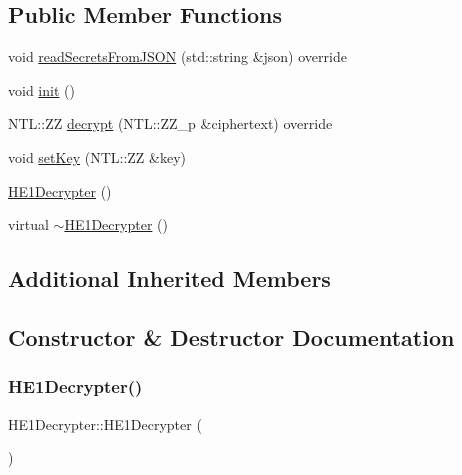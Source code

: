 \subsection*{Public Member Functions}
\begin{DoxyCompactItemize}
\item 
void \hyperlink{classHE1Decrypter_af60ccc6d0afe7555a9d1468ad7047733}{read\+Secrets\+From\+J\+S\+ON} (std\+::string \&json) override
\item 
void \hyperlink{classHE1Decrypter_ab10c6ecc422cbf5f492c7a039e2da97c}{init} ()
\item 
N\+T\+L\+::\+ZZ \hyperlink{classHE1Decrypter_a28cc03e8a37f321b8f805cc04b2e69e0}{decrypt} (N\+T\+L\+::\+Z\+Z\+\_\+p \&ciphertext) override
\item 
void \hyperlink{classHE1Decrypter_a7b06b69bcd5ef096067232f819321482}{set\+Key} (N\+T\+L\+::\+ZZ \&key)
\item 
\hyperlink{classHE1Decrypter_a68c49940560941d85b53e1b8d8d20df1}{H\+E1\+Decrypter} ()
\item 
virtual \hyperlink{classHE1Decrypter_a9beb110e7544804f2c906bae64932aab}{$\sim$\+H\+E1\+Decrypter} ()
\end{DoxyCompactItemize}
\subsection*{Additional Inherited Members}


\subsection{Constructor \& Destructor Documentation}
\mbox{\label{classHE1Decrypter_a68c49940560941d85b53e1b8d8d20df1}} 
\subsubsection{\texorpdfstring{H\+E1\+Decrypter()}{HE1Decrypter()}}
{\footnotesize\ttfamily H\+E1\+Decrypter\+::\+H\+E1\+Decrypter (\begin{DoxyParamCaption}{ }\end{DoxyParamCaption})\hspace{0.3cm}{\ttfamily [inline]}}

\mbox{\label{classHE1Decrypter_a9beb110e7544804f2c906bae64932aab}} 
